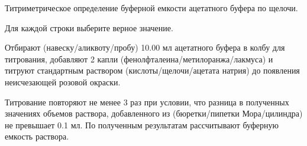 
Титриметрическое определение буферной емкости ацетатного буфера по щелочи.

Для каждой строки выберите верное значение.

Отбирают (навеску/аликвоту/пробу) 10.00 мл ацетатного буфера в колбу для титрования, добавляют 
2 капли (фенолфталеина/метилоранжа/лакмуса) и титруют стандартным раствором (кислоты/щелочи/ацетата натрия) 
до появления неисчезающей розовой окраски. 

Титрование повторяют не менее 3 раз при условии, что разница в полученных значениях объемов 
раствора, добавленного из (бюретки/пипетки Мора/цилиндра) не превышает 0.1 мл. По полученным результатам рассчитывают 
буферную емкость раствора.

